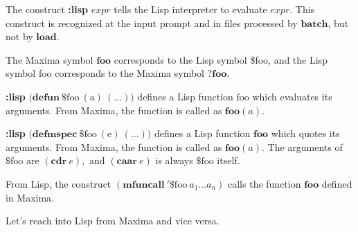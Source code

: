\documentclass[12pt]{article}
\begin{document}
The construct {\bf :lisp} $\mathit{expr}$ tells the Lisp interpreter 
to evaluate $\mathit{expr}$.
This construct is recognized at the input prompt and in files processed by $\mathbf{batch}$,
but not by $\mathbf{load}$.

The Maxima symbol $\mathbf{foo}$ corresponds to the Lisp symbol \$foo,
and the Lisp symbol foo corresponds to the Maxima symbol $\mathbf{?foo}$.

{\bf :lisp} $\mathrm{(}\mathbf{defun\ } \mathrm{\$foo\ (a)\ (\ldots))}$
defines a Lisp function $\mathrm{foo}$ which evaluates its arguments.
From Maxima, the function is called as $\mathbf{foo}(a)$.

{\bf :lisp} $\mathrm{(}\mathbf{defmspec\ } \mathrm{\$foo\ (e)\ (\ldots))}$
defines a Lisp function $\mathbf{foo}$ which quotes its arguments.
From Maxima, the function is called as $\mathbf{foo}(a)$.
The arguments of $\mathrm{\$foo}$ are $(\mathbf{cdr\ } e),$
and $(\mathbf{caar\ } e)$ is always $\mathrm{\$foo}$ itself.

From Lisp, the construct $(\mathbf{mfuncall\ '\$}\mathrm{foo\ }a_1 \ldots a_n)$ 
calls the function $\mathbf{foo}$ defined in Maxima.

Let's reach into Lisp from Maxima and vice versa.
\end{document}
